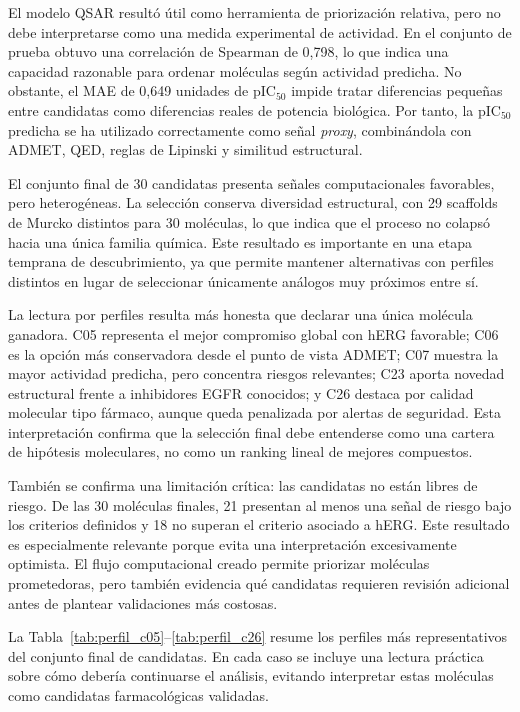 \documentclass[IB]{TFUOC}%
\begin{document}
El modelo QSAR resultó útil como herramienta de priorización relativa, pero no debe interpretarse como una medida experimental de actividad. En el conjunto de prueba obtuvo una correlación de Spearman de 0,798, lo que indica una capacidad razonable para ordenar moléculas según actividad predicha. No obstante, el MAE de 0,649 unidades de pIC$_{50}$ impide tratar diferencias pequeñas entre candidatas como diferencias reales de potencia biológica. Por tanto, la pIC$_{50}$ predicha se ha utilizado correctamente como señal \textit{proxy}, combinándola con ADMET, QED, reglas de Lipinski y similitud estructural.

El conjunto final de 30 candidatas presenta señales computacionales favorables, pero heterogéneas. La selección conserva diversidad estructural, con 29 scaffolds de Murcko distintos para 30 moléculas, lo que indica que el proceso no colapsó hacia una única familia química. Este resultado es importante en una etapa temprana de descubrimiento, ya que permite mantener alternativas con perfiles distintos en lugar de seleccionar únicamente análogos muy próximos entre sí.

La lectura por perfiles resulta más honesta que declarar una única molécula ganadora. C05 representa el mejor compromiso global con hERG favorable; C06 es la opción más conservadora desde el punto de vista ADMET; C07 muestra la mayor actividad predicha, pero concentra riesgos relevantes; C23 aporta novedad estructural frente a inhibidores EGFR conocidos; y C26 destaca por calidad molecular tipo fármaco, aunque queda penalizada por alertas de seguridad. Esta interpretación confirma que la selección final debe entenderse como una cartera de hipótesis moleculares, no como un ranking lineal de mejores compuestos.

También se confirma una limitación crítica: las candidatas no están libres de riesgo. De las 30 moléculas finales, 21 presentan al menos una señal de riesgo bajo los criterios definidos y 18 no superan el criterio asociado a hERG. Este resultado es especialmente relevante porque evita una interpretación excesivamente optimista. El flujo computacional creado permite priorizar moléculas prometedoras, pero también evidencia qué candidatas requieren revisión adicional antes de plantear validaciones más costosas.


La Tabla~\ref{tab:perfil_c05}--\ref{tab:perfil_c26} resume los perfiles más representativos del conjunto final de candidatas. En cada caso se incluye una lectura práctica sobre cómo debería continuarse el análisis, evitando interpretar estas moléculas como candidatas farmacológicas validadas.
\end{document}
